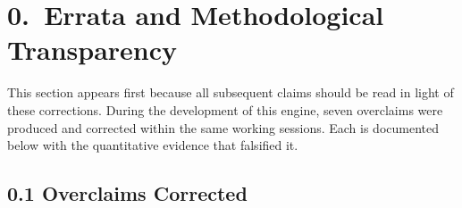 \documentclass[11pt]{amsart}
\begin{document}
\maketitle


\section*{0.\ Errata and Methodological Transparency}
\label{sec:errata}

This section appears first because all subsequent claims should be read in
light of these corrections. During the development of this engine, seven
overclaims were produced and corrected within the same working sessions. Each
is documented below with the quantitative evidence that falsified it.

\subsection*{0.1 Overclaims Corrected}
\end{document}
